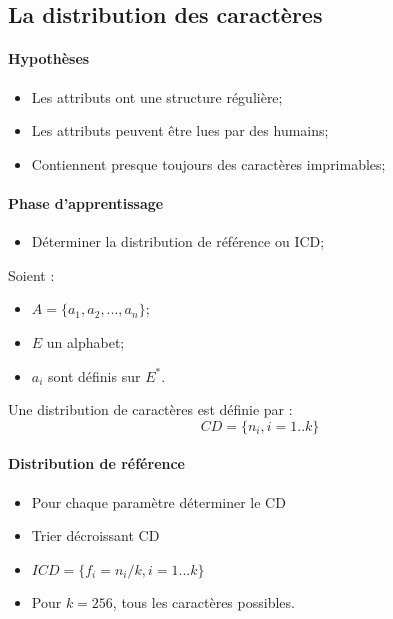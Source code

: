 \documentclass[a4paper,10pt,justified,openany]{tufte-book}
\begin{document}
 
\subsection{La distribution des caractères}

 \paragraph{Hypothèses}
  \begin{itemize}
   \item Les attributs ont une structure régulière;
   \item Les attributs peuvent être lues par des humains;
   \item Contiennent presque toujours des caractères imprimables;
  \end{itemize}

  \paragraph{Phase d'apprentissage}
  \begin{itemize}
   \item Déterminer la distribution de référence ou ICD;
  \end{itemize}
  
  Soient :
   \begin{itemize}
    \item $A = \{a_1,a_2,...,a_n\}$;
    \item $E$ un alphabet; 
    \item $a_i$ sont définis sur $E^{*}$. 
   \end{itemize}
   Une distribution de caractères est définie par : 
  \begin{equation}
   CD = \{n_i, i=1..k\}
  \end{equation}




 \paragraph{Distribution de référence}
  \begin{itemize}
   \item Pour chaque paramètre déterminer le CD
   \item Trier décroissant CD
   \item $ICD = \{f_i = n_i/k, i=1...k\}$
   \item Pour $k=256$, tous les caractères possibles. 
  \end{itemize}
\end{document}

